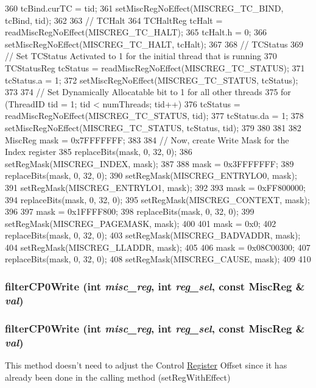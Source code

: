 \begin{DoxyCode}
{{360         tcBind.curTC = tid;
361         setMiscRegNoEffect(MISCREG_TC_BIND, tcBind, tid);
362     }
363     // TCHalt
364     TCHaltReg tcHalt = readMiscRegNoEffect(MISCREG_TC_HALT);
365     tcHalt.h = 0;
366     setMiscRegNoEffect(MISCREG_TC_HALT, tcHalt);
367 
368     // TCStatus
369     // Set TCStatus Activated to 1 for the initial thread that is running
370     TCStatusReg tcStatus = readMiscRegNoEffect(MISCREG_TC_STATUS);
371     tcStatus.a = 1;
372     setMiscRegNoEffect(MISCREG_TC_STATUS, tcStatus);
373 
374     // Set Dynamically Allocatable bit to 1 for all other threads
375     for (ThreadID tid = 1; tid < numThreads; tid++) {
376         tcStatus = readMiscRegNoEffect(MISCREG_TC_STATUS, tid);
377         tcStatus.da = 1;
378         setMiscRegNoEffect(MISCREG_TC_STATUS, tcStatus, tid);
379     }
380 
381 
382     MiscReg mask = 0x7FFFFFFF;
383 
384     // Now, create Write Mask for the Index register
385     replaceBits(mask, 0, 32, 0);
386     setRegMask(MISCREG_INDEX, mask);
387 
388     mask = 0x3FFFFFFF;
389     replaceBits(mask, 0, 32, 0);
390     setRegMask(MISCREG_ENTRYLO0, mask);
391     setRegMask(MISCREG_ENTRYLO1, mask);
392 
393     mask = 0xFF800000;
394     replaceBits(mask, 0, 32, 0);
395     setRegMask(MISCREG_CONTEXT, mask);
396 
397     mask = 0x1FFFF800;
398     replaceBits(mask, 0, 32, 0);
399     setRegMask(MISCREG_PAGEMASK, mask);
400 
401     mask = 0x0;
402     replaceBits(mask, 0, 32, 0);
403     setRegMask(MISCREG_BADVADDR, mask);
404     setRegMask(MISCREG_LLADDR, mask);
405 
406     mask = 0x08C00300;
407     replaceBits(mask, 0, 32, 0);
408     setRegMask(MISCREG_CAUSE, mask);
409 
410 }
\end{DoxyCode}
\hypertarget{classMipsISA_1_1ISA_aadf74b7e5f09ecd0cc35aeb0a25b4420}{
\subsubsection[{filterCP0Write}]{ filterCP0Write (int {\em misc\_\-reg}, \/  int {\em reg\_\-sel}, \/  const {\bf MiscReg} \& {\em val})}}
\label{classMipsISA_1_1ISA_aadf74b7e5f09ecd0cc35aeb0a25b4420}
\hypertarget{classMipsISA_1_1ISA_aadf74b7e5f09ecd0cc35aeb0a25b4420}{
\subsubsection[{filterCP0Write}]{ filterCP0Write (int {\em misc\_\-reg}, \/  int {\em reg\_\-sel}, \/  const {\bf MiscReg} \& {\em val})}}
\label{classMipsISA_1_1ISA_aadf74b7e5f09ecd0cc35aeb0a25b4420}
This method doesn't need to adjust the Control \hyperlink{classRegister}{Register} Offset since it has already been done in the calling method (setRegWithEffect) 


